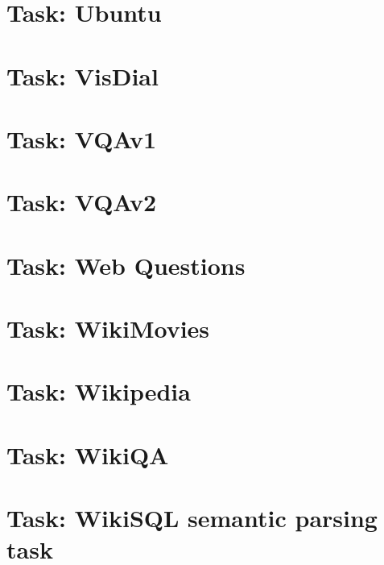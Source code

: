 \documentclass[twoside]{book}
\newcommand{\+}{\discretionary{\mbox{\scriptsize$\hookleftarrow$}}{}{}}
\begin{document}
\chapter{Task\+: Ubuntu}
\label{md_parlai_tasks_ubuntu_README}

\chapter{Task\+: Vis\+Dial}
\label{md_parlai_tasks_visdial_README}

\chapter{Task\+: V\+Q\+Av1}
\label{md_parlai_tasks_vqa_v1_README}

\chapter{Task\+: V\+Q\+Av2}
\label{md_parlai_tasks_vqa_v2_README}

\chapter{Task\+: Web Questions}
\label{md_parlai_tasks_webquestions_README}

\chapter{Task\+: Wiki\+Movies}
\label{md_parlai_tasks_wikimovies_README}

\chapter{Task\+: Wikipedia}
\label{md_parlai_tasks_wikipedia_README}

\chapter{Task\+: Wiki\+QA}
\label{md_parlai_tasks_wikiqa_README}

\chapter{Task\+: Wiki\+S\+QL semantic parsing task}
\label{md_parlai_tasks_wikisql_README}

\end{document}
